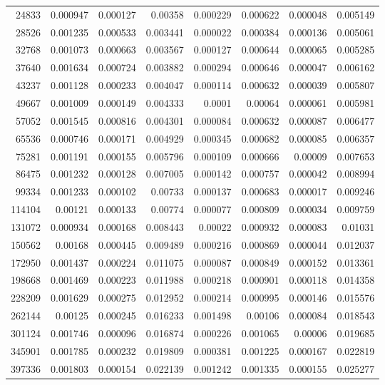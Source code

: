 \begin{longtable}{r r r r r r r r}
24833 & 0.000947 & 0.000127 & 0.00358 & 0.000229 & 0.000622 & 0.000048 & 0.005149 \\
28526 & 0.001235 & 0.000533 & 0.003441 & 0.000022 & 0.000384 & 0.000136 & 0.005061 \\
32768 & 0.001073 & 0.000663 & 0.003567 & 0.000127 & 0.000644 & 0.000065 & 0.005285 \\
37640 & 0.001634 & 0.000724 & 0.003882 & 0.000294 & 0.000646 & 0.000047 & 0.006162 \\
43237 & 0.001128 & 0.000233 & 0.004047 & 0.000114 & 0.000632 & 0.000039 & 0.005807 \\
49667 & 0.001009 & 0.000149 & 0.004333 & 0.0001 & 0.00064 & 0.000061 & 0.005981 \\
57052 & 0.001545 & 0.000816 & 0.004301 & 0.000084 & 0.000632 & 0.000087 & 0.006477 \\
65536 & 0.000746 & 0.000171 & 0.004929 & 0.000345 & 0.000682 & 0.000085 & 0.006357 \\
75281 & 0.001191 & 0.000155 & 0.005796 & 0.000109 & 0.000666 & 0.00009 & 0.007653 \\
86475 & 0.001232 & 0.000128 & 0.007005 & 0.000142 & 0.000757 & 0.000042 & 0.008994 \\
99334 & 0.001233 & 0.000102 & 0.00733 & 0.000137 & 0.000683 & 0.000017 & 0.009246 \\
114104 & 0.00121 & 0.000133 & 0.00774 & 0.000077 & 0.000809 & 0.000034 & 0.009759 \\
131072 & 0.000934 & 0.000168 & 0.008443 & 0.00022 & 0.000932 & 0.000083 & 0.01031 \\
150562 & 0.00168 & 0.000445 & 0.009489 & 0.000216 & 0.000869 & 0.000044 & 0.012037 \\
172950 & 0.001437 & 0.000224 & 0.011075 & 0.000087 & 0.000849 & 0.000152 & 0.013361 \\
198668 & 0.001469 & 0.000223 & 0.011988 & 0.000218 & 0.000901 & 0.000118 & 0.014358 \\
228209 & 0.001629 & 0.000275 & 0.012952 & 0.000214 & 0.000995 & 0.000146 & 0.015576 \\
262144 & 0.00125 & 0.000245 & 0.016233 & 0.001498 & 0.00106 & 0.000084 & 0.018543 \\
301124 & 0.001746 & 0.000096 & 0.016874 & 0.000226 & 0.001065 & 0.00006 & 0.019685 \\
345901 & 0.001785 & 0.000232 & 0.019809 & 0.000381 & 0.001225 & 0.000167 & 0.022819 \\
397336 & 0.001803 & 0.000154 & 0.022139 & 0.001242 & 0.001335 & 0.000155 & 0.025277 \\

\end{longtable}
